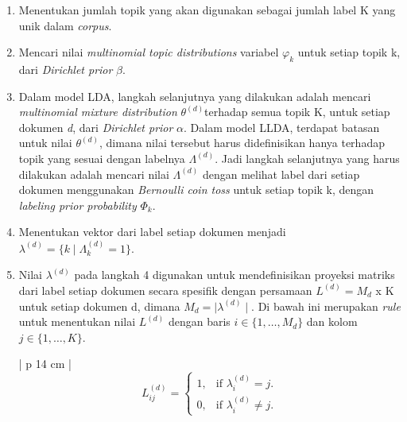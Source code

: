 \begin{enumerate}[nolistsep,leftmargin=0.5cm]
\item
Menentukan jumlah topik yang akan digunakan sebagai jumlah label K yang unik dalam \textit{corpus}.

\item
Mencari nilai \textit{multinomial topic distributions} variabel $\varphi _{k}$ untuk setiap topik k, dari \textit{Dirichlet prior} $\beta$.

\item 
Dalam model LDA, langkah selanjutnya yang dilakukan adalah mencari \textit{multinomial mixture distribution} $\theta ^{(d)} $terhadap semua topik K, untuk setiap dokumen \textit{d}, dari \textit{Dirichlet prior} $\alpha$. Dalam model LLDA, terdapat batasan untuk nilai $\theta ^{(d)}$, dimana nilai tersebut harus didefinisikan hanya terhadap topik yang sesuai dengan labelnya $\Lambda ^{(d)}$. Jadi langkah selanjutnya yang harus dilakukan adalah mencari nilai $\Lambda ^{(d)}$ dengan melihat label dari setiap dokumen menggunakan \textit{Bernoulli coin toss} untuk setiap topik k, dengan \textit{labeling prior probability} $\Phi _{k}$.

\item 
Menentukan vektor dari label setiap dokumen menjadi $\lambda ^{(d)}= \lbrace k\mid\Lambda _{k}^{(d)}=1\rbrace $.

\item 
Nilai $\lambda ^{(d)}$ pada langkah 4 digunakan untuk mendefinisikan proyeksi matriks dari label setiap dokumen secara spesifik dengan persamaan $L^{(d)}= M_{d}$ x K untuk setiap dokumen d, dimana $M_{d}= \mid \lambda ^{(d)}\mid$. Di bawah 
ini merupakan \textit{rule} untuk menentukan nilai $L^{(d)}$ dengan baris $i \in \lbrace 1, \ldots ,M_{d}\rbrace $ dan kolom $j \in \lbrace 1, \ldots ,K\rbrace $.
\setcounter{numberedCntDA}{\theenumi}

\begin{table}[H]
\small
\centering
\begin{adjustbox}{width=1\textwidth}
\begin{tabular}{| p {14 cm} |}
\hline
$$
  L_{ij}^{(d)}=\begin{cases}
    1, & \text{if $\lambda_{i}^{(d)}= j$}.\\
    0, & \text{if $\lambda _{i}^{(d)}\ne j$}.
  \end{cases}
$$
\\
\hline
\end{tabular}
\end{adjustbox}
\end{table}


\end{enumerate}
